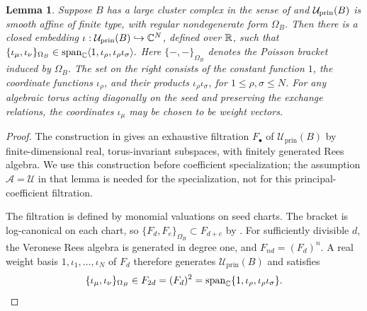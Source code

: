 \documentclass[12pt, letter]{amsart}
\newtheorem{lemma}[theorem]{Lemma}
\theoremstyle{definition}
\newcommand{\U}{\mathscr U}
\newcommand{\A}{\mathscr A}
\newcommand{\pr}{\mathrm{prin}}
\numberwithin{equation}{section}
\begin{document}
\begin{lemma}\label{lem:quadratic}
Suppose $B$ has a large cluster complex in the sense of \cite{GHKK} and $\cU_{\pr}(B)$ is smooth affine
of finite type, with regular nondegenerate form $\Omega_B$.
Then there is a closed embedding
$\iota:\cU_{\pr}(B)\hookrightarrow\C^N$, defined over $\mathbb R$, such that
$
 \{\iota_\mu,\iota_\nu\}_{\Omega_B}\in
 \operatorname{span}_{\mathbb C} \langle 1,\iota_\rho,\iota_\rho\iota_\sigma\rangle.
$
Here $\{-,-\}_{\Omega_B}$ denotes the Poisson bracket induced by
$\Omega_B$. The set on the right consists of the constant function
$1$, the coordinate functions $\iota_\rho$, and their products
$\iota_\rho\iota_\sigma$, for $1\le\rho,\sigma\le N$.
For any algebraic torus acting diagonally on the seed and preserving
the exchange relations, the coordinates $\iota_\mu$ may be chosen
to be weight vectors.
\end{lemma}
\begin{proof}
 The  construction in
\cite[proof of Lemma~B.1]{HS} gives an exhaustive filtration
$F_\bullet$ of $\U_{\pr}(B)$ by finite-dimensional real,
torus-invariant subspaces, with finitely generated Rees algebra.
We use this construction before coefficient specialization;
the assumption $\A=\U$ in that lemma is needed for the
specialization, not for this principal-coefficient filtration.

The filtration is defined by monomial valuations on seed charts.
The bracket is log-canonical on each chart, so
$\{F_d,F_e\}_{\Omega_B}\subset F_{d+e}$ by
\cite[proof of Lemma~B.2]{HS}.
For sufficiently divisible $d$, the Veronese Rees algebra is
generated in degree one, and $F_{nd}=(F_d)^n$.
A real weight basis $1,\iota_1,\ldots,\iota_N$ of $F_d$ therefore
generates $\U_{\pr}(B)$ and satisfies
\[
 \{\iota_\mu,\iota_\nu\}_{\Omega_B}\in F_{2d}
 =(F_d)^2
 =\operatorname{span}_{\mathbb C}\{1,\iota_\rho,\iota_\rho\iota_\sigma\}.
 \qedhere
\]
\end{proof}
\end{document}
